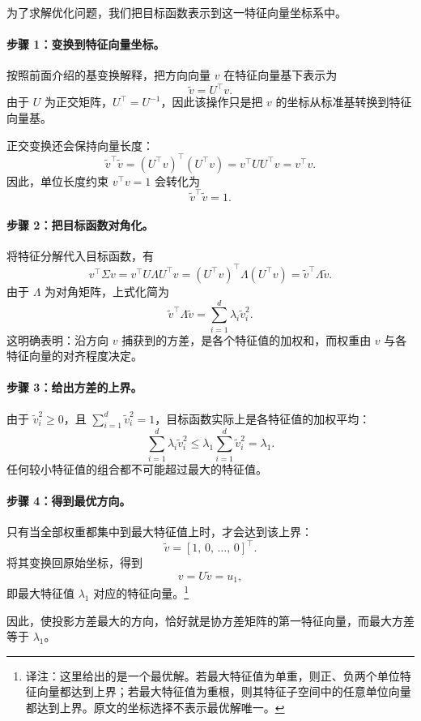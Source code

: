 为了求解优化问题，我们把目标函数表示到这一特征向量坐标系中。

\paragraph{步骤 1：变换到特征向量坐标。}
按照前面介绍的基变换解释，把方向向量 \(v\) 在特征向量基下表示为
\[
\tilde{v} = U^\top v.
\]
由于 \(U\) 为正交矩阵，\(U^\top = U^{-1}\)，因此该操作只是把 \(v\) 的坐标从标准基转换到特征向量基。

正交变换还会保持向量长度：
\[
\tilde{v}^\top \tilde{v}
=
(U^\top v)^\top (U^\top v)
=
v^\top U U^\top v
=
v^\top v.
\]
因此，单位长度约束 \(v^\top v = 1\) 会转化为
\[
\tilde{v}^\top \tilde{v} = 1.
\]

\paragraph{步骤 2：把目标函数对角化。}
将特征分解代入目标函数，有
\[
v^\top \Sigma v
=
v^\top U \Lambda U^\top v
=
(U^\top v)^\top \Lambda (U^\top v)
=
\tilde{v}^\top \Lambda \tilde{v}.
\]
由于 \(\Lambda\) 为对角矩阵，上式化简为
\[
\tilde{v}^\top \Lambda \tilde{v}
=
\sum_{i=1}^d \lambda_i \tilde{v}_i^2.
\]
这明确表明：沿方向 \(v\) 捕获到的方差，是各个特征值的加权和，而权重由 \(v\) 与各特征向量的对齐程度决定。

\paragraph{步骤 3：给出方差的上界。}
由于 \(\tilde{v}_i^2 \ge 0\)，且 \(\sum_{i=1}^d \tilde{v}_i^2 = 1\)，目标函数实际上是各特征值的加权平均：
\[
\sum_{i=1}^d \lambda_i \tilde{v}_i^2
\le
\lambda_1 \sum_{i=1}^d \tilde{v}_i^2
=
\lambda_1.
\]
任何较小特征值的组合都不可能超过最大的特征值。

\paragraph{步骤 4：得到最优方向。}
只有当全部权重都集中到最大特征值上时，才会达到该上界：
\[
\tilde{v} = [1,\,0,\,\ldots,\,0]^\top.
\]
将其变换回原始坐标，得到
\[
v = U \tilde{v} = u_1,
\]
即最大特征值 \(\lambda_1\) 对应的特征向量。\footnote{译注：这里给出的是一个最优解。若最大特征值为单重，则正、负两个单位特征向量都达到上界；若最大特征值为重根，则其特征子空间中的任意单位向量都达到上界。原文的坐标选择不表示最优解唯一。}

因此，使投影方差最大的方向，恰好就是协方差矩阵的第一特征向量，而最大方差等于 \(\lambda_1\)。

